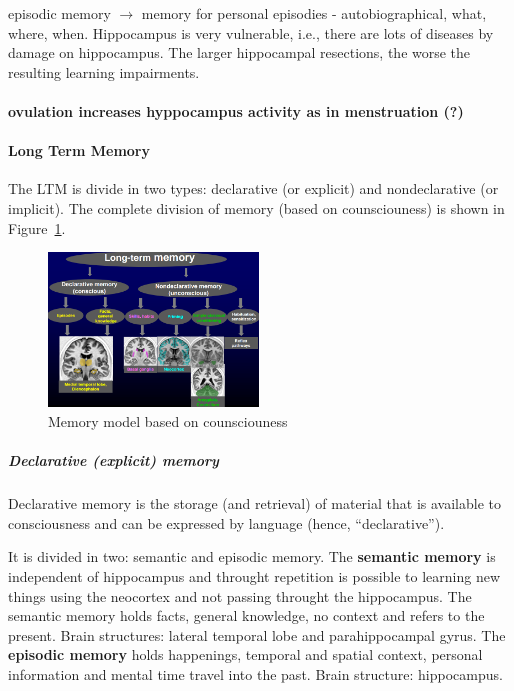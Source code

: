 \documentclass[12pt,article,oneside,a4paper]{memoir}
\begin{document}
episodic memory $\rightarrow$ memory for personal
episodies - autobiographical, what, where, when.
Hippocampus is very vulnerable, i.e., there are lots of diseases by damage on
hippocampus. The larger hippocampal resections, the worse the resulting learning
impairments.

\paragraph{ovulation increases hyppocampus activity as in menstruation (?)}

\paragraph{Long Term Memory}
The LTM is divide in two types: declarative (or explicit) and nondeclarative
(or implicit). The complete division of memory (based on counsciouness) is shown
in Figure~\ref{fig:old-memory-model}.

\begin{figure}[h]
  \centering
  \includegraphics[width=0.5\textwidth]{imgs/old-memory-model.png}
  \caption{Memory model based on counsciouness}
  \label{fig:old-memory-model}
\end{figure}

\subparagraph{Declarative (explicit) memory}
Declarative memory is the storage (and retrieval) of material that is available
to consciousness and can be expressed by language (hence, “declarative”).

It is divided in two: semantic and episodic memory.
The \textbf{semantic memory} is independent of hippocampus and throught
repetition is possible to learning new things using the neocortex and not passing
throught the hippocampus. The semantic memory holds facts, general knowledge,
no context and refers to the present.
Brain structures: lateral temporal lobe and parahippocampal gyrus.
The \textbf{episodic memory} holds happenings, temporal and spatial context,
personal information and mental time travel into the past.
Brain structure: hippocampus.
\end{document}
